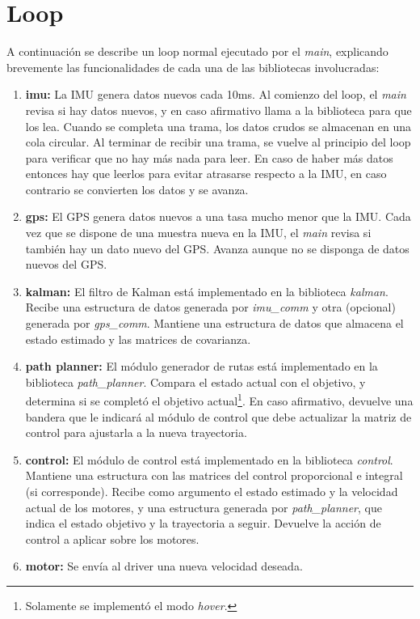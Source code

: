 \documentclass[main]{subfiles}
\begin{document}
\section{Loop}
\label{sec:software-loop}

A continuaci\'on se describe un loop normal ejecutado por el \textit{main}, explicando brevemente las funcionalidades de cada una de las bibliotecas involucradas:
\begin{enumerate}

\item \textbf{imu:} La IMU genera datos nuevos cada 10ms. Al comienzo del loop, el \textit{main} revisa si hay datos nuevos, y en caso afirmativo llama a la biblioteca para que los lea. Cuando se completa una trama, los datos crudos se almacenan en una cola circular. Al terminar de recibir una trama, se vuelve al principio del loop para verificar que no hay m\'as nada para leer. En caso de haber m\'as datos entonces hay que leerlos para evitar atrasarse respecto a la IMU, en caso contrario se convierten los datos y se avanza.

\item \textbf{gps:} El GPS genera datos nuevos a una tasa mucho menor que la IMU. Cada vez que se dispone de una muestra nueva en la IMU, el \textit{main} revisa si tambi\'en hay un dato nuevo del GPS. Avanza aunque no se disponga de datos nuevos del GPS.

\item \textbf{kalman:} El filtro de Kalman est\'a implementado en la biblioteca \textit{kalman}. Recibe una estructura de datos generada por \textit{imu\_comm} y otra (opcional) generada por \textit{gps\_comm}. Mantiene una estructura de datos que almacena el estado estimado y las matrices de covarianza.

\item \textbf{path planner:} El m\'odulo generador de rutas est\'a implementado en la biblioteca \textit{path\_planner}. Compara el estado actual con el objetivo, y determina si se completó el objetivo actual\footnote{Solamente se implement\'o el modo \textit{hover}.}. En caso afirmativo, devuelve una bandera que le indicar\'a al m\'odulo de control que debe actualizar la matriz de control para ajustarla a la nueva trayectoria.

\item \textbf{control:} El m\'odulo de control est\'a implementado en la biblioteca \textit{control}. Mantiene una estructura con las matrices del control proporcional e integral (si corresponde). Recibe como argumento el estado estimado y la velocidad actual de los motores, y una estructura generada por \textit{path\_planner}, que indica el estado objetivo y la trayectoria a seguir. Devuelve la acci\'on de control a aplicar sobre los motores.

\item \textbf{motor:} Se env\'ia al driver una nueva velocidad deseada.

\end{enumerate}
\end{document}
